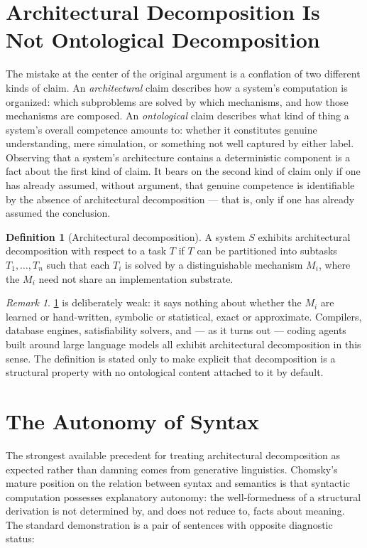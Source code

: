 \documentclass[11pt]{book}
\theoremstyle{plain}
\theoremstyle{definition}
\newtheorem{definition}[theorem]{Definition}
\theoremstyle{remark}
\newtheorem{remark}[theorem]{Remark}
\begin{document}
\section{Architectural Decomposition Is Not Ontological Decomposition}

The mistake at the center of the original argument is a conflation of
two different kinds of claim. An \emph{architectural} claim describes
how a system's computation is organized: which subproblems are solved
by which mechanisms, and how those mechanisms are composed. An
\emph{ontological} claim describes what kind of thing a system's
overall competence amounts to: whether it constitutes genuine
understanding, mere simulation, or something not well captured by
either label. Observing that a system's architecture contains a
deterministic component is a fact about the first kind of claim. It
bears on the second kind of claim only if one has already assumed,
without argument, that genuine competence is identifiable by the
absence of architectural decomposition --- that is, only if one has
already assumed the conclusion.

\begin{definition}[Architectural decomposition]
\label{def:architectural-decomposition}
A system $S$ exhibits architectural decomposition with respect to a
task $T$ if $T$ can be partitioned into subtasks $T_1, \dots, T_n$ such
that each $T_i$ is solved by a distinguishable mechanism $M_i$, where
the $M_i$ need not share an implementation substrate.
\end{definition}

\begin{remark}
\cref{def:architectural-decomposition} is deliberately weak: it says
nothing about whether the $M_i$ are learned or hand-written, symbolic
or statistical, exact or approximate. Compilers, database engines,
satisfiability solvers, and --- as it turns out --- coding agents built
around large language models all exhibit architectural decomposition
in this sense. The definition is stated only to make explicit that
decomposition is a structural property with no ontological content
attached to it by default.
\end{remark}

\section{The Autonomy of Syntax}

The strongest available precedent for treating architectural
decomposition as expected rather than damning comes from generative
linguistics. Chomsky's mature position on the relation between syntax
and semantics is that syntactic computation possesses explanatory
autonomy: the well-formedness of a structural derivation is not
determined by, and does not reduce to, facts about meaning. The
standard demonstration is a pair of sentences with opposite
diagnostic status:
\end{document}
